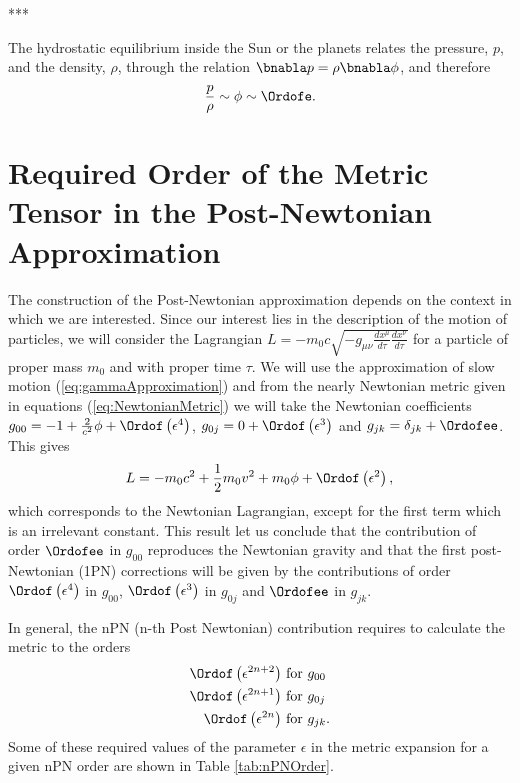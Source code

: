 ***

The hydrostatic equilibrium inside the Sun or the planets relates the pressure, $p$, and the density, $\rho$, through the relation $\bnabla p = \rho \bnabla \phi$, and therefore
\begin{equation}
\frac{p}{\rho} \sim \phi \sim \Ordofe.
\end{equation}

\section{Required Order of the Metric Tensor in the Post-Newtonian Approximation}

The construction of the Post-Newtonian approximation depends on the context in which we are interested. Since our interest lies in the description of the motion of particles, we will consider the Lagrangian $L= - m_0 c \sqrt{-g_{\mu \nu} \frac{dx^\mu}{d\tau}\frac{dx^\nu}{d\tau}}$ for a particle of proper mass $m_0$ and with proper time $\tau$. We will use the approximation of slow motion (\ref{eq:gammaApproximation}) and from the nearly Newtonian metric given in equations (\ref{eq:NewtonianMetric})  we will take the Newtonian coefficients $g_{00} = -1 + \frac{2}{c^2}\phi + \Ordof \left( \epsilon^4 \right)$, $g_{0j} = 0 + \Ordof \left( \epsilon^{3}\right)$ and $g_{jk} = \delta_{jk} + \Ordofee$. This gives 
\begin{equation}
L = -m_0c^2 + \frac{1}{2} m_0v^2 + m_0\phi + \Ordof \left( \epsilon^2 \right),
\end{equation}
which corresponds to the Newtonian Lagrangian, except for the first term which is an irrelevant constant. This result let us conclude that the contribution of order $\Ordofee$ in $g_{00}$ reproduces the Newtonian gravity and that the first post-Newtonian (1PN) corrections will be given by the contributions of order $\Ordof \left( \epsilon^4 \right)$ in $g_{00}$, $\Ordof \left( \epsilon^{3}\right)$ in $g_{0j}$ and  $\Ordofee$ in $g_{jk}$.  

In general, the nPN (n-th Post Newtonian) contribution requires to calculate the metric to the orders
\begin{subequations}
\begin{align}
\Ordof \left( \epsilon^{2n+2}\right)  &\text{ for } g_{00} \\
\Ordof \left( \epsilon^{2n+1}\right)  &\text{ for } g_{0j} \\
\Ordof \left( \epsilon^{2n}\right)  &\text{ for } g_{jk} .
\end{align} 
\end{subequations}
Some of these required values of the parameter $\epsilon$  in the metric expansion for a given nPN order are shown in Table \ref{tab:nPNOrder}.

